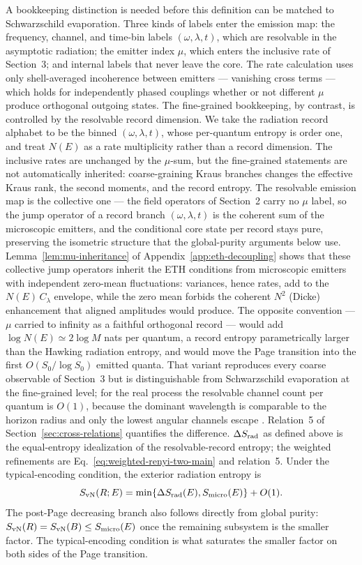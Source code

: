 \documentclass[12pt]{article}
\newcommand{\Smicro}{S_{\rm micro}}
\begin{document}
A bookkeeping distinction is needed before this definition can be matched
to Schwarzschild evaporation.  Three kinds of labels enter the emission
map: the frequency, channel, and time-bin labels $(\omega,\lambda,t)$,
which are resolvable in the asymptotic radiation; the emitter index $\mu$,
which enters the inclusive rate of Section~3; and internal labels that
never leave the core.  The rate calculation uses only shell-averaged
incoherence between emitters --- vanishing cross terms --- which holds for
independently phased couplings whether or not different $\mu$ produce
orthogonal outgoing states.  The fine-grained bookkeeping, by contrast, is
controlled by the resolvable record dimension.  We take the radiation
record alphabet to be the binned $(\omega,\lambda,t)$, whose per-quantum
entropy is order one, and treat $N(E)$ as a rate multiplicity rather than
a record dimension.  The inclusive rates are unchanged by the $\mu$-sum,
but the fine-grained statements are not automatically inherited:
coarse-graining Kraus branches changes the effective Kraus rank, the
second moments, and the record entropy.  The resolvable emission map is
the collective one --- the field operators of Section~2 carry no $\mu$
label, so the jump operator of a record branch $(\omega,\lambda,t)$ is
the coherent sum of the microscopic emitters, and the conditional core
state per record stays pure, preserving the isometric structure that the
global-purity arguments below use.
Lemma~\ref{lem:mu-inheritance} of Appendix~\ref{app:eth-decoupling}
shows that these collective jump operators inherit the ETH conditions
from microscopic emitters with independent zero-mean fluctuations:
variances, hence rates, add to the $N(E)\,C_\lambda$ envelope, while the
zero mean forbids the coherent $N^2$ (Dicke) enhancement that aligned
amplitudes would produce.  The opposite convention --- $\mu$ carried to
infinity as a faithful orthogonal record --- would add
$\log N(E)\simeq2\log M$ nats per quantum, a record entropy parametrically
larger than the Hawking radiation entropy, and would move the Page
transition into the first $O(S_0/\log S_0)$ emitted quanta.  That variant
reproduces every coarse observable of Section~3 but is distinguishable
from Schwarzschild evaporation at the fine-grained level; for the real
process the resolvable channel count per quantum is $O(1)$, because the
dominant wavelength is comparable to the horizon radius and only the
lowest angular channels escape \cite{Page1976}.  Relation~5 of
Section~\ref{sec:cross-relations} quantifies the difference.
$\Delta S_{\rm rad}$ as defined above is the equal-entropy idealization of
the resolvable-record entropy; the weighted refinements are
Eq.~\eqref{eq:weighted-renyi-two-main} and relation~5.  Under the typical-encoding condition, the exterior radiation entropy is
\begin{equation}
    S_{\rm vN}(R;E)
    =
    \min\{\Delta S_{\rm rad}(E),\Smicro(E)\}
    +O(1).
\label{eq:pagecurve}
\end{equation}
The post-Page decreasing branch also follows directly from global purity:
$S_{\rm vN}(R)=S_{\rm vN}(B)\le \Smicro(E)$ once the remaining subsystem is the
smaller factor.  The typical-encoding condition is what saturates the smaller
factor on both sides of the Page transition.
\end{document}
